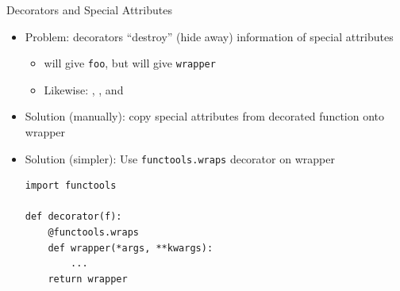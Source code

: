 
\begin{frame}[fragile]{Decorators and Special Attributes}
%
\begin{itemize}
\item Problem: decorators \enquote{destroy} (\ie hide away) information of special attributes
	\begin{itemize}
	\item {} will give \texttt{foo}, but  will give \texttt{wrapper}
	\item Likewise: , ,  and 
	\end{itemize}
\item Solution (manually): copy special attributes from decorated function onto wrapper
\item Solution (simpler): Use \texttt{functools.wraps} decorator on wrapper
%
\begin{codebox}
\begin{verbatim}
import functools

def decorator(f):
    @functools.wraps
    def wrapper(*args, **kwargs):
        ...
    return wrapper
\end{verbatim}
\end{codebox}
\end{itemize}
%
\end{frame}


